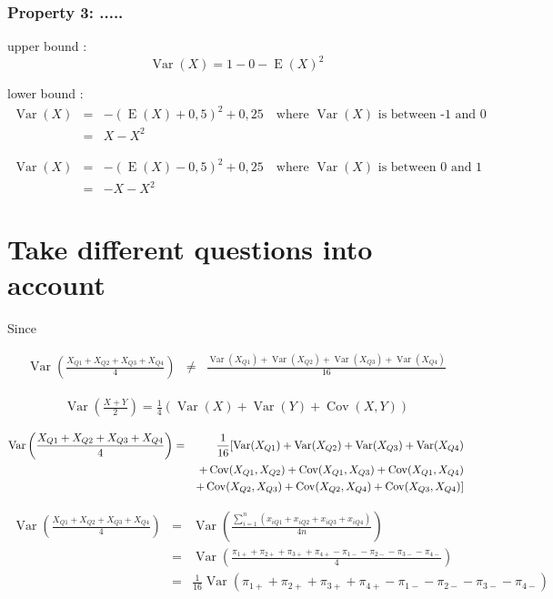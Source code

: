 \documentclass[12pt,a4paper,oneside]{book}
\DeclareMathOperator{\Var}{Var}
\DeclareMathOperator{\Cov}{Cov}
\DeclareMathOperator{\E}{E}
\begin{document}
\subsubsection{Property 3: .....}

upper bound : 
\begin{equation}
    \Var(X) = 1 - 0 - \E(X)^2
\end{equation}

lower bound : 
\begin{eqnarray}
\Var(X) &=& - (\E(X) + 0,5)^2 + 0,25 \quad \text{where } \Var(X) \text{ is between -1 and 0} \\
    &=& X - X^2 
\end{eqnarray}

\begin{eqnarray}
    \Var(X) &=& - (\E(X) - 0,5)^2 + 0,25 \quad \text{where } \Var(X) \text{ is between 0 and 1} \\
        &=& - X - X^2
\end{eqnarray}
    

\section{Take different questions into account}

Since 

\begin{eqnarray}
    \Var \left(\frac{X_{Q1} + X_{Q2} + X_{Q3} + X_{Q4}}{4} \right) &\neq&
    \frac{\Var(X_{Q1}) + \Var(X_{Q2}) + \Var(X_{Q3}) + \Var(X_{Q4})}{16} \nonumber
\end{eqnarray}


\begin{eqnarray}
    \Var \left(\frac{X+Y}{2} \right) = \frac{1}{4} \left( \Var (X) + \Var(Y) + \Cov (X,Y) \right) 
\end{eqnarray}

\begin{eqnarray}
    \Var \left(\frac{X_{Q1} + X_{Q2} + X_{Q3} + X_{Q4}}{4} \right) &=& \frac{1}{16} \large[ \Var(X_{Q1}) + \Var(X_{Q2}) + \Var(X_{Q3}) + \Var(X_{Q4}) \nonumber \\
    && + \Cov (X_{Q1},X_{Q2}) + \Cov (X_{Q1},X_{Q3}) + \Cov (X_{Q1},X_{Q4}) \nonumber \\
    &&  + \Cov (X_{Q2},X_{Q3}) + \Cov (X_{Q2},X_{Q4}) + \Cov (X_{Q3},X_{Q4}) \large] \nonumber
\end{eqnarray}

\begin{eqnarray}
    \Var \left(\frac{X_{Q1} + X_{Q2} + X_{Q3} + X_{Q4}}{4} \right) 
    &=& \Var \left(\frac{\sum_{i=1}^n \left(x_{i Q1} + x_{i Q2} + x_{i Q3} + x_{i Q4} \right)}{4n} \right) \nonumber \\
    &=& \Var \left(\frac{\pi_{1+} + \pi_{2+} + \pi_{3+} + \pi_{4+} - \pi_{1-} - \pi_{2-} - \pi_{3-} - \pi_{4-} }{4} \right) \nonumber \\
    &=& \frac{1}{16} \Var \left(\pi_{1+} + \pi_{2+} + \pi_{3+} + \pi_{4+} - \pi_{1-} - \pi_{2-} - \pi_{3-} - \pi_{4-} \right) \nonumber \\
\end{eqnarray}
\end{document}
